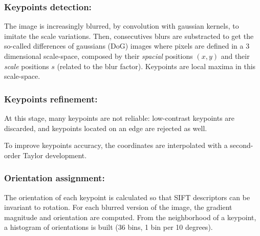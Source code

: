 \documentclass[preprint]{iucr}
\begin{document}
\subsubsection{Keypoints detection:}
The image is increasingly blurred, by convolution with gaussian kernels, to
imitate the scale variations.
Then, consecutives blurs are substracted to get the so-called differences of
gaussians (DoG) images where pixels are defined in a 3 dimensional
scale-space, composed by  their \emph{spacial} positions $(x,y)$ and their
\emph{scale} positions $s$ (related to the blur factor). Keypoints are
local maxima in this scale-space.



\subsubsection{Keypoints refinement:}

At this stage, many keypoints are not reliable: low-contrast keypoints are
discarded, and keypoints located on an edge are rejected as well.  

To improve keypoints accuracy, the coordinates are interpolated with a
second-order Taylor development. 


\subsubsection{Orientation assignment:}
The orientation of each keypoint is calculated  so that SIFT descriptors
can be invariant to rotation. 
For each blurred version of the image, the gradient magnitude and orientation
are computed. 
From the neighborhood of a keypoint, a histogram of orientations is built (36
bins, 1 bin per 10 degrees). 
\end{document}
